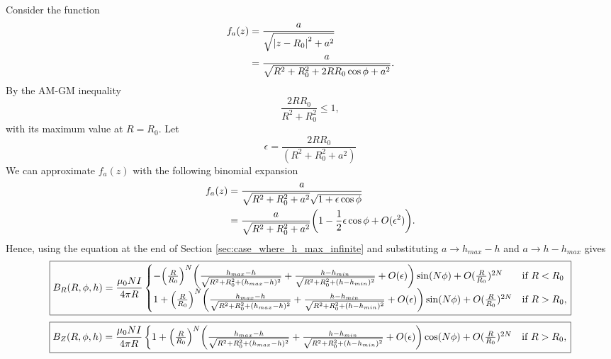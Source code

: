 \documentclass{article}
\begin{document}
Consider the function
\[\begin{aligned}
f_a(z) &= \frac{a}{\sqrt{\abs{z-R_0}^2+a^2}} \\
&= \frac{a}{\sqrt{R^2+R_0^2 + 2RR_0\cos\phi+a^2}}.
\end{aligned}\]
By the AM-GM inequality
\[\frac{2RR_0}{R^2+R_0^2}\le 1,\]
with its maximum value at $R=R_0$.
Let
\[\epsilon=\frac{2RR_0}{(R^2+R_0^2+a^2)}\]
We can approximate $f_a(z)$ with the following binomial expansion
\[\begin{aligned}
f_a(z) &= \frac{a}{\sqrt{R^2+R_0^2+a^2}\sqrt{1 + \epsilon\cos\phi}} \\
&= \frac{a}{\sqrt{R^2+R_0^2+a^2}}\qty(1 - \frac{1}{2}\epsilon\cos\phi
+ O(\epsilon^2)).
\end{aligned}\]
Hence, using the equation at the end of Section \ref{sec:case_where_h_max_infinite} and 
substituting $a\rightarrow h_{max} - h$ and $a\rightarrow h - h_{max}$ gives
\[\boxed{B_R(R, \phi, h) = \frac{\mu_0NI}{4\pi R}\begin{cases}
-\qty(\frac{R}{R_0})^N\qty(\frac{h_{max}-h}{\sqrt{R^2+R_0^2+(h_{max}-h)^2}}+\frac{h - h_{min}}{\sqrt{R^2+R_0^2+(h-h_{min})^2}}+ O(\epsilon))\sin(N\phi) +O(\frac{R}{R_0})^{2N} & \text{if } R<R_0\\
1 + \qty(\frac{R}{R_0})^N\qty(\frac{h_{max}-h}{\sqrt{R^2+R_0^2+(h_{max}-h)^2}}+\frac{h - h_{min}}{\sqrt{R^2+R_0^2+(h-h_{min})^2}}+ O(\epsilon))\sin(N\phi) +O(\frac{R}{R_0})^{2N} & \text{if } R>R_0,\\
\end{cases}}\]
\[\boxed{B_Z(R, \phi, h) = \frac{\mu_0NI}{4\pi R}\begin{cases}
1 + \qty(\frac{R}{R_0})^N\qty(\frac{h_{max}-h}{\sqrt{R^2+R_0^2+(h_{max}-h)^2}}+\frac{h - h_{min}}{\sqrt{R^2+R_0^2+(h-h_{min})^2}}+ O(\epsilon))\cos(N\phi) +O(\frac{R}{R_0})^{2N} & \text{if } R>R_0,\\
\end{cases}}\]



\end{document}
